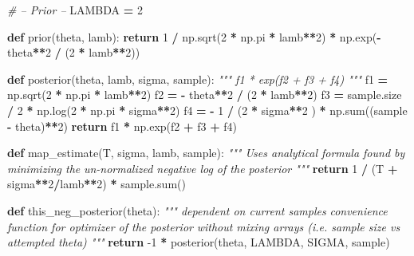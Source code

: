 \documentclass[]{article}
\newenvironment{Shaded}{\begin{snugshade}}{\end{snugshade}}
\newcommand{\BuiltInTok}[1]{#1}
\newcommand{\CommentTok}[1]{\textcolor[rgb]{0.56,0.35,0.01}{\textit{#1}}}
\newcommand{\ControlFlowTok}[1]{\textcolor[rgb]{0.13,0.29,0.53}{\textbf{#1}}}
\newcommand{\DecValTok}[1]{\textcolor[rgb]{0.00,0.00,0.81}{#1}}
\newcommand{\KeywordTok}[1]{\textcolor[rgb]{0.13,0.29,0.53}{\textbf{#1}}}
\newcommand{\NormalTok}[1]{#1}
\newcommand{\OperatorTok}[1]{\textcolor[rgb]{0.81,0.36,0.00}{\textbf{#1}}}
\begin{document}
\begin{Shaded}
\begin{Highlighting}[]
\CommentTok{# -- Prior --}
\NormalTok{LAMBDA }\OperatorTok{=} \DecValTok{2}


\KeywordTok{def}\NormalTok{ prior(theta, lamb):}
    \ControlFlowTok{return} \DecValTok{1} \OperatorTok{/}\NormalTok{ np.sqrt(}\DecValTok{2} \OperatorTok{*}\NormalTok{ np.pi }\OperatorTok{*}\NormalTok{ lamb}\OperatorTok{**}\DecValTok{2}\NormalTok{) }\OperatorTok{*}\NormalTok{ np.exp(}\OperatorTok{-}\NormalTok{ theta}\OperatorTok{**}\DecValTok{2} \OperatorTok{/}\NormalTok{ (}\DecValTok{2} \OperatorTok{*}\NormalTok{ lamb}\OperatorTok{**}\DecValTok{2}\NormalTok{))}


\KeywordTok{def}\NormalTok{ posterior(theta, lamb, sigma, sample):}
    \CommentTok{""" f1 * exp(f2 + f3 + f4) """}
\NormalTok{    f1 }\OperatorTok{=}\NormalTok{ np.sqrt(}\DecValTok{2} \OperatorTok{*}\NormalTok{ np.pi }\OperatorTok{*}\NormalTok{ lamb}\OperatorTok{**}\DecValTok{2}\NormalTok{)}
\NormalTok{    f2 }\OperatorTok{=} \OperatorTok{-}\NormalTok{ theta}\OperatorTok{**}\DecValTok{2} \OperatorTok{/}\NormalTok{ (}\DecValTok{2} \OperatorTok{*}\NormalTok{ lamb}\OperatorTok{**}\DecValTok{2}\NormalTok{)}
\NormalTok{    f3 }\OperatorTok{=}\NormalTok{ sample.size }\OperatorTok{/} \DecValTok{2} \OperatorTok{*}\NormalTok{ np.log(}\DecValTok{2} \OperatorTok{*}\NormalTok{ np.pi }\OperatorTok{*}\NormalTok{ sigma}\OperatorTok{**}\DecValTok{2}\NormalTok{)}
\NormalTok{    f4 }\OperatorTok{=} \OperatorTok{-} \DecValTok{1} \OperatorTok{/}\NormalTok{ (}\DecValTok{2} \OperatorTok{*}\NormalTok{ sigma}\OperatorTok{**}\DecValTok{2}\NormalTok{ ) }\OperatorTok{*}\NormalTok{ np.}\BuiltInTok{sum}\NormalTok{((sample }\OperatorTok{-}\NormalTok{ theta)}\OperatorTok{**}\DecValTok{2}\NormalTok{)}
    \ControlFlowTok{return}\NormalTok{ f1 }\OperatorTok{*}\NormalTok{ np.exp(f2 }\OperatorTok{+}\NormalTok{ f3 }\OperatorTok{+}\NormalTok{ f4)}


\KeywordTok{def}\NormalTok{ map_estimate(T, sigma, lamb, sample):}
    \CommentTok{""" Uses analytical formula found by minimizing the}
\CommentTok{    un-normalized negative log of the posterior """}
    \ControlFlowTok{return} \DecValTok{1} \OperatorTok{/}\NormalTok{ (T }\OperatorTok{+}\NormalTok{ sigma}\OperatorTok{**}\DecValTok{2}\OperatorTok{/}\NormalTok{lamb}\OperatorTok{**}\DecValTok{2}\NormalTok{) }\OperatorTok{*}\NormalTok{ sample.}\BuiltInTok{sum}\NormalTok{()}


\KeywordTok{def}\NormalTok{ this_neg_posterior(theta):}
    \CommentTok{""" dependent on current samples}
\CommentTok{    convenience function for optimizer of the posterior}
\CommentTok{    without mixing arrays (i.e. sample size vs attempted theta) """}
    \ControlFlowTok{return} \DecValTok{-1} \OperatorTok{*}\NormalTok{ posterior(theta, LAMBDA, SIGMA, sample)}



\end{Highlighting}
\end{Shaded}
\end{document}
